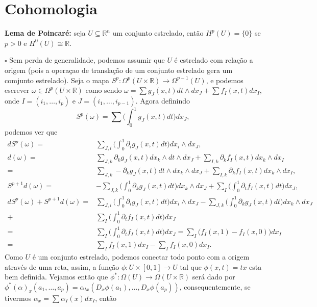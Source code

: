 \documentclass{article}
\begin{document}
	\section{Cohomologia}
	
	\textbf{Lema de Poincaré:} seja $U \subseteq \mathbb{R}^{n}$ um conjunto estrelado, então $H^{p}(U) = \{0\}$ se $p>0$ e $H^{0}(U) \cong \mathbb{R}$.
	
	$\square$ Sem perda de generalidade, podemos assumir que $U$ é estrelado com relação a origem (pois a operaçao de translação de um conjunto estrelado gera um comjunto estrelado). Seja o mapa $S^{p}: \Omega^{p}(U \times \mathbb{R}) \to \Omega^{p-1}(U)$, e podemos escrever $\omega \in \Omega^{p}(U \times \mathbb{R}) $ como sendo $\omega = \sum g_{J}(x,t)dt \wedge dx_{J} + \sum f_{I}(x,t)dx_{I}$, onde $I=(i_{1}, \dots ,i_{p})$ e $J=(i_{1}, \dots ,i_{p-1})$. Agora definindo
	$$
	S^{p}(\omega) = \sum \Big( \int_{0}^{1} g_{J}(x,t)dt \Big) dx_{J},
	$$
	podemos ver que
	$$
	\begin{aligned}
	dS^{p}(\omega) =& \sum_{J,i} \Big( \int_{0}^{1} \partial_{i} g_{J}(x,t)dt \Big) dx_{i} \wedge dx_{J},
	\\
	d(\omega) =& \sum_{J,k} \partial_{k} g_{J}(x,t) dx_{k} \wedge dt \wedge dx_{J} + \sum_{I,k} \partial_{k} f_{I}(x,t) dx_{k} \wedge dx_{I}
	\\
	=& \sum_{J,k} -\partial_{k} g_{J}(x,t) dt \wedge dx_{k} \wedge dx_{J} + \sum_{I,k} \partial_{k} f_{I}(x,t) dx_{k} \wedge dx_{I},
	\\
	S^{p+1}d(\omega) =&  -\sum_{J,k} \Big( \int_{0}^{1}  \partial_{k} g_{J}(x,t)dt \Big) dx_{k} \wedge dx_{J} + \sum_{I} \Big( \int_{0}^{1}  \partial_{t} f_{I}(x,t)dt \Big) dx_{J},
	\\
	d S^{p}(\omega) + S^{p+1}d(\omega) =& \sum_{J,i} \Big( \int_{0}^{1} \partial_{i} g_{J}(x,t)dt \Big) dx_{i} \wedge dx_{J} -\sum_{J,k} \Big( \int_{0}^{1}  \partial_{k} g_{J}(x,t)dt \Big) dx_{k} \wedge dx_{J} 
	\\
	+& \sum_{I} \Big( \int_{0}^{1}  \partial_{t} f_{I}(x,t)dt \Big) dx_{J}
	\\
	=& \sum_{I} \Big( \int_{0}^{1}  \partial_{t} f_{I}(x,t)dt \Big) dx_{J} = \sum_{I} \Big( f_{I}(x,1)  - f_{I}(x,0)\Big) dx_{I}
	\\
	=& \sum_{I} f_{I}(x,1) dx_{I} - \sum_{I} f_{I}(x,0) dx_{I}.
	\end{aligned}
	$$
	Como $U$ é um conjunto estrelado, podemos conectar todo ponto com a origem através de uma reta, assim, a função $\phi: U \times [0,1] \to U$ tal que $\phi(x,t) = tx$ esta bem definida. Vejamos então que $\phi^{*} : \Omega(U) \to \Omega(U \times \mathbb{R})$ será dado por $\phi^{*}(\alpha)_{x}(a_{1},\dots,a_{p}) = \alpha_{tx}(D_{x}\phi(a_{1}),\dots, D_{x}\phi(a_{p}))$, consequentemente, se tivermos $\alpha_{x} = \sum \alpha_{I}(x)dx_{I}$, então 
\end{document}
